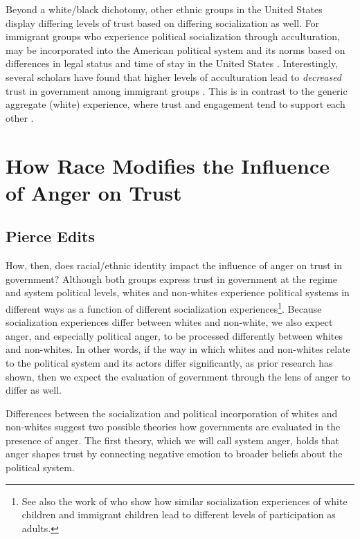 \documentclass[12t, letterpaper]{article}
\begin{document}
Beyond a white/black dichotomy, other ethnic groups in the United States display differing levels of trust based on differing socialization as well. For immigrant groups who experience political socialization through acculturation, may be incorporated into the American political system and its norms based on differences in legal status and time of stay in the United States \citep{uslaner2003}. Interestingly, several scholars have found that higher levels of acculturation lead to \textit{decreased} trust in government among immigrant groups \citep{abrajano2010,michelson2001}. This is in contrast to the generic aggregate (white) experience, where trust and engagement tend to support each other \citep{uslaner2005}. 

\section{How Race Modifies the Influence of Anger on Trust}
\label{sec:theory}

\subsection{Pierce Edits}

How, then, does racial/ethnic identity impact the influence of anger on trust in government? Although both groups express trust in government at the regime and system political levels, whites and non-whites experience political systems in different ways as a function of different socialization experiences\footnote{See also the work of \citet{humphries2013} who show how similar socialization experiences of white children and immigrant children lead to different levels of participation as adults.}. Because socialization experiences differ between whites and non-white, we also expect anger, and especially political anger, to be processed differently between whites and non-whites. In other words, if the way in which whites and non-whites relate to the political system and its actors differ significantly, as prior research has shown, then we expect the evaluation of government through the lens of anger to differ as well.

Differences between the socialization and political incorporation of whites and non-whites suggest two possible theories how governments are evaluated in the presence of anger. The first theory, which we will call system anger, holds that anger shapes trust by connecting negative emotion to broader beliefs about the political system. 
\end{document}

